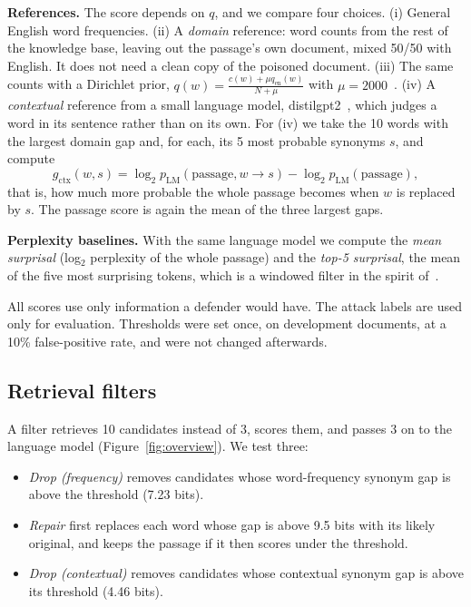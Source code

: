 \documentclass[10pt,journal,compsoc]{IEEEtran}
\begin{document}
\textbf{References.} The score depends on $q$, and we compare four choices. (i) General English word frequencies. (ii) A \emph{domain} reference: word counts from the rest of the knowledge base, leaving out the passage's own document, mixed 50/50 with English. It does not need a clean copy of the poisoned document. (iii) The same counts with a Dirichlet prior, $q(w)=\frac{c(w)+\mu q_{\mathrm{en}}(w)}{N+\mu}$ with $\mu=2000$~\cite{zhai2004smoothing}. (iv) A \emph{contextual} reference from a small language model, distilgpt2~\cite{radford2019gpt2,sanh2019distilbert}, which judges a word in its sentence rather than on its own. For (iv) we take the 10 words with the largest domain gap and, for each, its 5 most probable synonyms $s$, and compute
\begin{equation}
g_{\mathrm{ctx}}(w,s)=\log_2 p_{\mathrm{LM}}(\text{passage}, w\!\to\! s)-\log_2 p_{\mathrm{LM}}(\text{passage}),
\end{equation}
that is, how much more probable the whole passage becomes when $w$ is replaced by $s$. The passage score is again the mean of the three largest gaps.

\textbf{Perplexity baselines.} With the same language model we compute the \emph{mean surprisal} (log$_2$ perplexity of the whole passage) and the \emph{top-5 surprisal}, the mean of the five most surprising tokens, which is a windowed filter in the spirit of~\cite{jain2023baseline}.

All scores use only information a defender would have. The attack labels are used only for evaluation. Thresholds were set once, on development documents, at a 10\% false-positive rate, and were not changed afterwards.

\subsection{Retrieval filters}\label{sec:filters}
A filter retrieves 10 candidates instead of 3, scores them, and passes 3 on to the language model (Figure~\ref{fig:overview}). We test three:
\begin{itemize}
\item \emph{Drop (frequency)} removes candidates whose word-frequency synonym gap is above the threshold (7.23 bits).
\item \emph{Repair} first replaces each word whose gap is above 9.5 bits with its likely original, and keeps the passage if it then scores under the threshold.
\item \emph{Drop (contextual)} removes candidates whose contextual synonym gap is above its threshold (4.46 bits).
\end{itemize}
\end{document}
